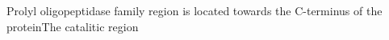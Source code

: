 Prolyl oligopeptidase family region is located towards the C-terminus of the proteinThe catalitic region 